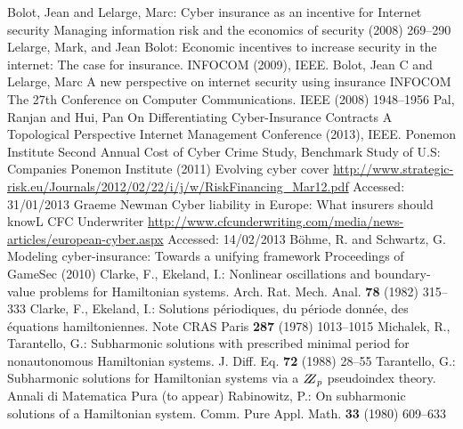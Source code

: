 \documentclass{llncs}
\begin{document}
%
\begin{thebibliography}{[MT1]}
%
  Bolot, Jean and Lelarge, Marc:
  Cyber insurance as an incentive for Internet security
  Managing information risk and the economics of security
  (2008) 269--290
%
	Lelarge, Mark, and Jean Bolot:
	Economic incentives to increase security in the internet: The case for insurance.
	INFOCOM (2009), IEEE.
%
	Bolot, Jean C and Lelarge, Marc
 	A new perspective on internet security using insurance
 	INFOCOM The 27th Conference on Computer Communications. IEEE
 	(2008) 1948--1956
	Pal, Ranjan and Hui, Pan	
	On Differentiating Cyber-Insurance Contracts A Topological Perspective
  	Internet Management Conference (2013), IEEE.
%
Ponemon Institute
Second Annual Cost of Cyber Crime Study, Benchmark Study of U.S: Companies
Ponemon Institute (2011)
%
  Evolving cyber cover
  \url{http://www.strategic-risk.eu/Journals/2012/02/22/i/j/w/RiskFinancing_Mar12.pdf}
  Accessed: 31/01/2013
	Graeme Newman
	Cyber liability in Europe: What insurers should knowL
	CFC Underwriter \url{http://www.cfcunderwriting.com/media/news-articles/european-cyber.aspx}
 	Accessed: 14/02/2013
  B{\"o}hme, R. and Schwartz, G.
  Modeling cyber-insurance: Towards a unifying framework
  Proceedings of GameSec (2010)
%
Clarke, F., Ekeland, I.:
Nonlinear oscillations and
boundary-value problems for Hamiltonian systems.
Arch. Rat. Mech. Anal. {\bfseries 78} (1982) 315--333
%
Clarke, F., Ekeland, I.:
Solutions p\'{e}riodiques, du
p\'{e}riode donn\'{e}e, des \'{e}quations hamiltoniennes.
Note CRAS Paris {\bfseries 287} (1978) 1013--1015
%
Michalek, R., Tarantello, G.:
Subharmonic solutions with prescribed minimal
period for nonautonomous Hamiltonian systems.
J. Diff. Eq. {\bfseries 72} (1988) 28--55
%
Tarantello, G.:
Subharmonic solutions for Hamiltonian
systems via a $\bbbz_{p}$ pseudoindex theory.
Annali di Matematica Pura (to appear)
%
Rabinowitz, P.:
On subharmonic solutions of a Hamiltonian system.
Comm. Pure Appl. Math. {\bfseries 33} (1980) 609--633
\end{thebibliography}
%
\end{document}
